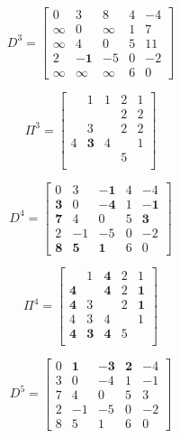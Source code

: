 				\begin{equation}
					D^3 = \begin{bmatrix}
						0 & 3 & 8 & 4 & -4 \\
						\infty & 0  &\infty & 1 & 7 \\
						\infty & 4 & 0 & 5 & 11\\
						2 & \mathbf{-1} & -5 & 0 &-2\\
						\infty & \infty & \infty & 6 & 0
					\end{bmatrix}
				\end{equation}

				\begin{equation}
					\Pi^3 = \begin{bmatrix}
						& 1 & 1 & 2 & 1 \\
						& & & 2 & 2\\
						& 3 & & 2 & 2 \\
						4 & \mathbf{3} & 4 & & 1\\
						& & & 5 & \\
					\end{bmatrix}
				\end{equation}

				\begin{equation}
					D^4 = \begin{bmatrix}
						0 & 3 & \mathbf{-1} & 4 & -4 \\
						\mathbf{3} & 0  &\mathbf{-4} & 1 & \mathbf{-1} \\
						\mathbf{7} & 4 & 0 & 5 & \mathbf{3}\\
						2 & -1 & -5 & 0 &-2\\
						\mathbf{8} & \mathbf{5} & \mathbf{1} & 6 & 0
					\end{bmatrix}
				\end{equation}

				\begin{equation}
					\Pi^4 = \begin{bmatrix}
						& 1 & \mathbf{4} & 2 & 1 \\
						\mathbf{4} & & \mathbf{4} & 2 & \mathbf{1}\\
						\mathbf{4} & 3 & & 2 & \mathbf{1} \\
						4 & 3 & 4 & & 1\\
						\mathbf{4} & \mathbf{3} & \mathbf{4} & 5 & \\
					\end{bmatrix}
				\end{equation}

				\begin{equation}
					D^5 = \begin{bmatrix}
						0 & \mathbf{1} & \mathbf{-3} & \mathbf{2} & -4 \\
						3 & 0  & -4 & 1 & -1 \\
						7 & 4 & 0 & 5 & 3\\
						2 & -1 & -5 & 0 &-2\\
						8 & 5 & 1 & 6 & 0
					\end{bmatrix}
				\end{equation}

